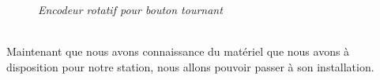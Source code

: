 \begin{figure}[H]
\begin{center}
\end{center}
	\caption{ \textit{Encodeur rotatif pour bouton tournant}}
\end{figure}\\

Maintenant que nous avons connaissance du matériel que nous avons à disposition pour notre station, nous allons pouvoir passer à son installation.





